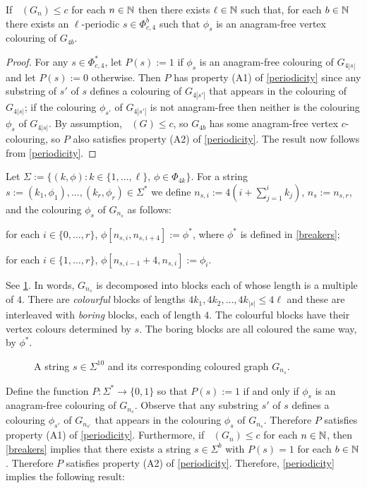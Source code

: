 \documentclass{patmorin}
\DeclareMathOperator{\afcn}{\dot{\chi}_\pi}
\begin{document}
\begin{lem}\label{breakers}
    If $\afcn(G_n)\le c$ for each $n\in\mathbb{N}$ then there exists $\ell\in\mathbb{N}$ such that, for each $b\in\mathbb{N}$ there exists an $\ell$-periodic $s\in\Phi_{c,4}^b$ such that $\phi_s$ is an anagram-free vertex colouring of $G_{4b}$.
\end{lem}

\begin{proof}
    For any $s\in\Phi_{c,4}^*$, let $P(s):=1$ if $\phi_s$ is an anagram-free colouring of $G_{4|s|}$ and let $P(s):=0$ otherwise.  Then $P$ has property (A1) of \cref{periodicity} since any substring of $s'$ of $s$ defines a colouring of $G_{4|s'|}$ that appears in the colouring of $G_{4|s|}$; if the colouring $\phi_{s'}$ of $G_{4|s'|}$ is not anagram-free then neither is the colouring $\phi_s$ of $G_{4|s|}$. By assumption, $\afcn(G)\le c$, so $G_{4b}$ has some anagram-free vertex $c$-colouring, so $P$ also satisfies property (A2) of \cref{periodicity}.  The result now follows from  \cref{periodicity}.
\end{proof}

Let $\Sigma:=\{(k,\phi):k\in\{1,\ldots,\ell\},\, \phi\in\Phi_{4k}\}$.  For a string $s:=(k_1,\phi_1),\ldots,(k_r,\phi_r)\in\Sigma^*$ we define $n_{s,i}:=4(i+\sum_{j=1}^i k_j)$, $n_s:=n_{s,r}$, and the colouring $\phi_s$ of $G_{n_s}$ as follows:
\begin{compactenum}
    \item for each $i\in\{0,\ldots,r\}$, $\phi[n_{s,i},n_{s,i+4}]:=\phi^*$, where $\phi^*$ is defined in \cref{breakers};
    \item for each $i\in\{1,\ldots,r\}$, $\phi[n_{s,i-1}+4,n_{s,i}]:=\phi_i$.
\end{compactenum}
See \cref{bigexample}.  In words, $G_{n_s}$ is decomposed into blocks each of whose length is a multiple of $4$.  There are \emph{colourful} blocks of lengths $4k_1,4k_2,\ldots,4k_{|s|}\le 4\ell$ and these are interleaved with \emph{boring} blocks, each of length $4$.  The colourful blocks have their vertex colours determined by $s$. The boring blocks are all coloured the same way, by $\phi^*$.

\begin{figure}
    \caption{A string $s\in\Sigma^{10}$ and its corresponding coloured graph $G_{n_s}$.}
    \label{bigexample}
\end{figure}
Define the function $P:\Sigma^*\to\{0,1\}$ so that $P(s):=1$ if and only if $\phi_s$ is an anagram-free colouring of $G_{n_s}$.  Observe that any substring $s'$ of $s$ defines a colouring $\phi_{s'}$ of $G_{n_{s'}}$ that appears in the colouring $\phi_s$ of $G_{n_s}$. Therefore $P$ satisfies property (A1) of \cref{periodicity}.  Furthermore, if $\afcn(G_n)\le c$ for each $n\in\mathbb{N}$, then \cref{breakers} implies that there exists a string $s\in\Sigma^{b}$ with $P(s)=1$ for each $b\in\mathbb{N}$.  Therefore $P$ satisfies property (A2) of \cref{periodicity}.  Therefore, \cref{periodicity} implies the following result:
\end{document}
